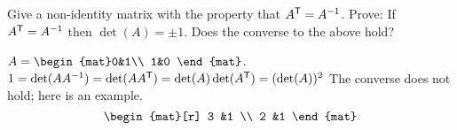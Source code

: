 
\begin{Exercise}[
name={},
title={}, 
difficulty=0,
origin={\cite{JH}}]
\Question Give a non-identity matrix with the property that
    \( {{A}^{\mathsf{T}}}=A^{-1} \).
\Question Prove: If \( {{A}^{\mathsf{T}}}=A^{-1} \) then \( \det(A)=\pm 1 \).
\Question Does the converse to the above hold?
\end{Exercise}

\begin{Answer}
\Question $A=\begin{mat}0&1\\ 1&0 \end{mat}$.
\Question $1=\det(AA^{-1})=\det(A{{A}^{\mathsf{T}}})
               =\det(A)\det({{A}^{\mathsf{T}}})=(\det(A))^2$
\Question The converse does not hold; here is an example.
\begin{equation*}
\begin{mat}[r]
3  &1  \\
2  &1
\end{mat}
\end{equation*}

\end{Answer}
